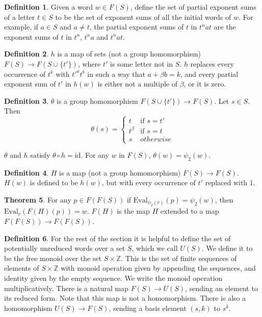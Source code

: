 \documentclass[12pt]{article} %
\theoremstyle{definition}
\newtheorem{theorem}{Theorem}[section]
\theoremstyle{definition}
\theoremstyle{definition}
\theoremstyle{definition}
\theoremstyle{definition}
\newtheorem{defn}[theorem]{Definition}
\theoremstyle{definition}
\begin{document}
\begin{defn}
  Given a word $w \in F(S)$, define the set of partial exponent sums of a letter $t \in S$ to
  be the set of exponent sums of all the initial words of $w$. For example, if $a \in S$ and
  $a \ne t$, the partial
  exponent sums of $t$ in $t^n a t$ are the exponent sums of $t$ in
  $t^n$, $t^na$ and $t^nat$.
\end{defn}

\begin{defn}
  $h$ is a map of sets (not a group homomorphism) $F(S) \to F(S \cup \{t'\})$,
  where $t'$ is some letter not in $S$.
  $h$ replaces every occurrence of $t^k$ with $t'^at^b$ in such a way that $a + \beta b = k$,
  and every partial exponent sum of $t'$ in $h(w)$ is either not a multiple of $\beta$,
  or it is zero.
\end{defn}

\begin{defn}
  $\theta$ is a group homomorphism $F(S \cup \{t'\}) \to F(S)$. Let $s \in S$. Then
  \begin{equation}
    \theta(s) = \begin{cases}
      t & \text{if } s = t' \\
      t^\beta & \text{if } s = t \\
      s & otherwise
    \end{cases}
  \end{equation}
\end{defn}

$\theta$ and $h$ satisfy $\theta \circ h = \text{id}$. For any $w$ in $F(S)$,
$\theta(w) = \psi_2(w)$.

\begin{defn} \label{PowProof}
  $H$ is a map (not a group homomorphism) $F(S) \to F(S)$. $H(w)$ is defined to be
  $h(w)$, but with every occurrence of $t'$ replaced with $1$.
\end{defn}

\begin{theorem}\label{powproof}
  For any $p \in F(F(S))$ if $\text{Eval}_{\psi_2(r)}(p) = \psi_2(w)$,
  then $\text{Eval}_r(F(H)(p)) = w$. $F(H)$ is the map $H$ extended to a map
  $F(F(S)) \to F(F(S))$.
\end{theorem}

\begin{defn}
  For the rest of the section it is helpful to define the set of potentially unreduced
  words over a set $S$, which we call $U(S)$.
  We define it to be the free monoid over the set $S \times \mathbb{Z}$.
  This is the set of finite sequences of elements of $S \times \mathbb{Z}$ with monoid operation
  given by appending the sequences, and identity given by the empty sequence. We write
  the monoid operation multiplicatively. There is a natural map $F(S) \to U(S)$,
  sending an element to its reduced form. Note that this map is not a homomorphism.
  There is also a homomorphism $U(S) \to F(S)$, sending a basis element $(s, k)$ to
  $s^k$.
\end{defn}
\end{document}
